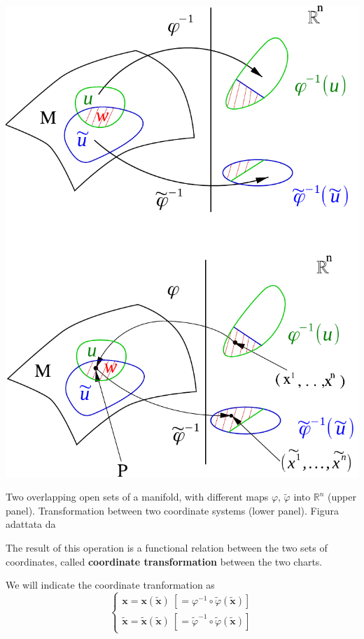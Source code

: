 \documentclass[../main.tex]{subfiles}
\begin{document}
\begin{marginfigure}
	\includegraphics{images/coordinate_change.pdf}
	\caption[Coordinate transformation]{Two overlapping open sets of a manifold, with different maps $\varphi$, $\tilde{\varphi}$ into $\mathbb{R}^n$ (upper panel). Transformation between two coordinate systems (lower panel). Figura adattata da \cite{ferrari2020general}}
\end{marginfigure} 
The result of this operation is a functional relation between the two sets of coordinates,
called \textbf{coordinate transformation} between the two charts.
\begin{kaobox}[frametitle=Notation]
We will indicate the coordinate tranformation as
\begin{equation}\label{eq:coord-trans}
\begin{cases}
\mathbf{x}=\mathbf{x}(\tilde{\mathbf{x}})\ \left[=\varphi^{-1}\circ\tilde{\varphi}(\tilde{\mathbf{x}})\right]\\
\tilde{\mathbf{x}}=\tilde{\mathbf{x}}(\tilde{\mathbf{x}})\ \left[=\tilde{\varphi}^{-1}\circ\tilde{\varphi}(\tilde{\mathbf{x}})\right]
\end{cases}
\end{equation}
\end{kaobox}
\end{document}
